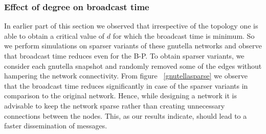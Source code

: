 \subsubsection{Effect of degree on broadcast time}

  In earlier part of this section we observed that irrespective of the topology one is able to  
obtain a critical value of $d$ for which the 
  broadcast time is minimum. So we perform simulations on sparser variants of these gnutella networks
and observe that broadcast time reduces even for the B-P. To obtain sparser variants, we consider each gnutella snapshot and randomly removed 
some of the edges 
without hampering the network connectivity. From figure ~\ref{gnutellasparse} we observe that the broadcast time reduces significantly
in case of the sparser variants in comparison to the original network.
Hence, while designing a network it is advisable to keep the network sparse rather than creating unnecessary connections between the nodes.
This, as our results indicate, should lead to a faster dissemination of messages.


